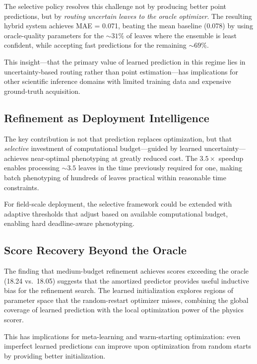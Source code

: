 \documentclass[11pt,a4paper]{article}
\begin{document}
The selective policy resolves this challenge not by producing better
point predictions, but by \emph{routing uncertain leaves to the oracle optimizer}.
The resulting hybrid system achieves MAE = 0.071, beating the mean baseline
(0.078) by using oracle-quality parameters for the ${\sim}31\%$ of leaves
where the ensemble is least confident, while accepting fast predictions
for the remaining ${\sim}69\%$.

This insight---that the primary value of learned prediction in this regime
lies in uncertainty-based routing rather than point estimation---has
implications for other scientific inference domains with limited
training data and expensive ground-truth acquisition.

\subsection{Refinement as Deployment Intelligence}

The key contribution is not that prediction replaces optimization,
but that \emph{selective} investment of computational budget---guided
by learned uncertainty---achieves near-optimal phenotyping at greatly
reduced cost. The $3.5\times$ speedup enables processing ${\sim}3.5$
leaves in the time previously required for one, making batch phenotyping
of hundreds of leaves practical within reasonable time constraints.

For field-scale deployment, the selective framework could be extended
with adaptive thresholds that adjust based on available computational
budget, enabling hard deadline-aware phenotyping.

\subsection{Score Recovery Beyond the Oracle}

The finding that medium-budget refinement achieves scores exceeding the
oracle (18.24 vs.\ 18.05) suggests that the amortized predictor provides
useful inductive bias for the refinement search. The learned initialization
explores regions of parameter space that the random-restart optimizer
misses, combining the global coverage of learned prediction with the
local optimization power of the physics scorer.

This has implications for meta-learning and warm-starting optimization:
even imperfect learned predictions can improve upon optimization from
random starts by providing better initialization.
\end{document}
